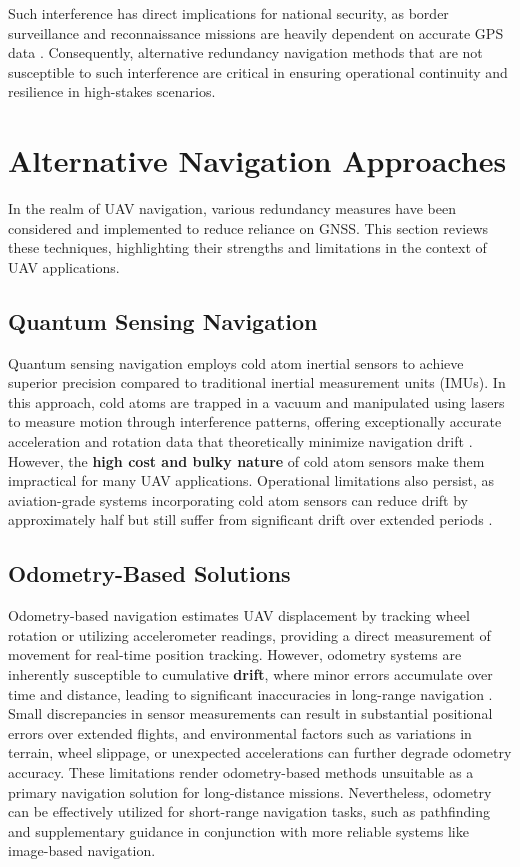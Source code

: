 Such interference has direct implications for national security, as border surveillance and reconnaissance missions are heavily dependent on accurate GPS data \cite{Weiss2024}. Consequently, alternative redundancy navigation methods that are not susceptible to such interference are critical in ensuring operational continuity and resilience in high-stakes scenarios.

\section{Alternative Navigation Approaches}

In the realm of UAV navigation, various redundancy measures have been considered and implemented to reduce reliance on GNSS. This section reviews these techniques, highlighting their strengths and limitations in the context of UAV applications.

\subsection{Quantum Sensing Navigation}

Quantum sensing navigation employs cold atom inertial sensors to achieve superior precision compared to traditional inertial measurement units (IMUs). In this approach, cold atoms are trapped in a vacuum and manipulated using lasers to measure motion through interference patterns, offering exceptionally accurate acceleration and rotation data that theoretically minimize navigation drift \cite{wright2022cold}. However, the \textbf{high cost and bulky nature} of cold atom sensors make them impractical for many UAV applications. Operational limitations also persist, as aviation-grade systems incorporating cold atom sensors can reduce drift by approximately half but still suffer from significant drift over extended periods \cite{wright2022cold}. 

\subsection{Odometry-Based Solutions}

Odometry-based navigation estimates UAV displacement by tracking wheel rotation or utilizing accelerometer readings, providing a direct measurement of movement for real-time position tracking. However, odometry systems are inherently susceptible to cumulative \textbf{drift}, where minor errors accumulate over time and distance, leading to significant inaccuracies in long-range navigation \cite{Zhuang2023}. Small discrepancies in sensor measurements can result in substantial positional errors over extended flights, and environmental factors such as variations in terrain, wheel slippage, or unexpected accelerations can further degrade odometry accuracy. These limitations render odometry-based methods unsuitable as a primary navigation solution for long-distance missions. Nevertheless, odometry can be effectively utilized for short-range navigation tasks, such as pathfinding and supplementary guidance in conjunction with more reliable systems like image-based navigation.


